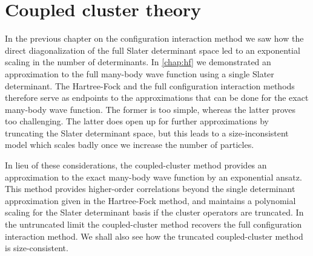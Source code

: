 \chapter{Coupled cluster theory}
    \label{chap:cc}
    In the previous chapter on the configuration interaction method we saw how
    the direct diagonalization of the full Slater determinant space led to an
    exponential scaling in the number of determinants.
    In \autoref{chap:hf} we demonstrated an approximation to the full many-body
    wave function using a single Slater determinant.
    The Hartree-Fock and the full configuration interaction methods therefore
    serve as endpoints to the approximations that can be done for the exact
    many-body wave function.
    The former is too simple, whereas the latter proves too challenging.
    The latter does open up for further approximations by truncating the Slater
    determinant space, but this leads to a size-inconsistent model which scales
    badly once we increase the number of particles.

    In lieu of these considerations, the coupled-cluster method provides an
    approximation to the exact many-body wave function by an exponential ansatz.
    This method provides higher-order correlations beyond the single determinant
    approximation given in the Hartree-Fock method, and maintains a polynomial
    scaling for the Slater determinant basis if the cluster operators are
    truncated.
    In the untruncated limit the coupled-cluster method recovers the full
    configuration interaction method.
    We shall also see how the truncated coupled-cluster method is
    size-consistent.


